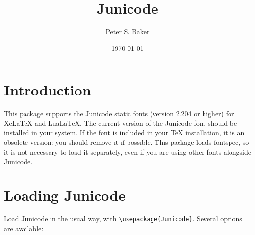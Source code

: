 \documentclass{article}
\title{Junicode}
\author{Peter S. Baker}
\date{\today}
\newcommand{\fspec}{{\sffamily fontspec}}
\begin{document}
\maketitle

\section{Introduction}

This package supports the Junicode static fonts (version 2.204 or higher)
for XeLaTeX and LuaLaTeX. The current version of the Junicode font should
be installed in your system. If the font is included in your TeX installation,
it is an obsolete version: you should remove it if possible. This package loads
\fspec, so it is not necessary to load it separately, even if you are using
other fonts alongside Junicode.

\section{Loading Junicode}

Load Junicode in the usual way, with {\verb|\usepackage{Junicode}|}. Several options are available:
\end{document}
